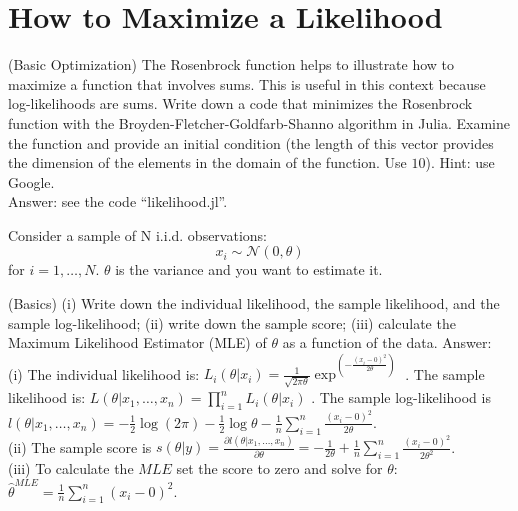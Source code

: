 \section{How to Maximize a Likelihood}

\begin{exercise} (Basic Optimization)
\noindent The Rosenbrock function helps to illustrate how to maximize a function that involves sums. This is useful in this context because log-likelihoods are sums. Write down a code that minimizes the  Rosenbrock function with the Broyden-Fletcher-Goldfarb-Shanno algorithm in Julia. Examine the function and provide an initial condition (the length of this vector provides the dimension of the elements in the domain of the function. Use $10$). Hint: use Google.\\
\noindent Answer: see the code ``likelihood.jl''.
\end{exercise}

Consider a sample of N i.i.d. observations:
\begin{equation}
x_{i} \sim \mathcal{N}(0,\theta)
\end{equation}
\noindent for $i = 1, \ldots, N$. $\theta$ is the variance and you want to estimate it. 

\begin{exercise} (Basics) \label{exercise:basics}
(i) Write down the individual likelihood, the sample likelihood, and the sample log-likelihood; (ii) write down the sample score; (iii) calculate the Maximum Likelihood Estimator (MLE) of $\theta$ as a function of the data.
\noindent Answer:\\
\noindent (i) The individual likelihood is: $L_{i}(\theta|x_{i}) = \frac{1}{\sqrt{2\pi\theta}} \exp^{\left( -\frac{ \left( x_{i} - 0 \right)^{2}}{2 \theta} \right)}$ . The sample likelihood is: $L(\theta | x_{1}, \ldots, x_{n}) = \prod \limits _{i=1} ^{n} L_{i}(\theta|x_{i}) $ . The sample log-likelihood is $l(\theta | x_{1}, \ldots, x_{n}) = - \frac{1}{2} \log (2 \pi) - \frac{1}{2} \log \theta - \frac{1}{n} \sum \limits _{i=1} ^{n} \frac{ \left( x_{i} - 0 \right)^{2}}{2 \theta} $.\\
\noindent (ii) The sample score is $s(\theta | y) = \frac{\partial l(\theta | x_{1}, \ldots, x_{n})}{\partial \theta} = -\frac{1}{2\theta} + \frac{1}{n} \sum \limits _{i=1} ^{n} \frac{ \left( x_{i} - 0 \right)^{2}}{2 \theta^2}$. \\
\noindent (iii) To calculate the $MLE$ set the score to zero and solve for $\theta$: $\hat{\theta}^{MLE} = \frac{1}{n} \sum \limits _{i=1} ^{n} \left( x_{i} - 0 \right)^{2}$.\\

\end{exercise}

